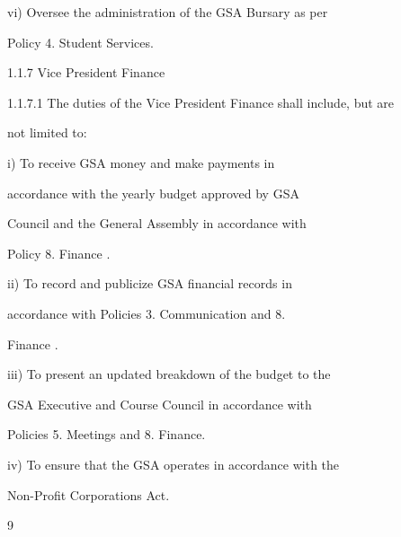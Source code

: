          vi)      Oversee  the  administration  of  the  GSA  Bursary  as  per  

                  Policy 4. Student Services.   

                    

1.1.7  Vice President Finance   

  

1.1.7.1 The duties of the Vice President Finance shall include, but are  

          not limited to:   

  

         i)       To      receive      GSA        money        and     make       payments         in  



                  accordance  with  the  yearly  budget  approved  by  GSA  



                  Council  and  the  General  Assembly  in  accordance  with  



                  Policy 8. Finance .   

  

         ii)      To   record   and   publicize   GSA   financial   records   in  



                  accordance   with   Policies   3.   Communication   and   8.  



                  Finance .   

  

         iii)     To  present  an  updated  breakdown  of  the  budget  to  the  



                  GSA Executive and Course Council in accordance with  



                  Policies 5. Meetings and 8. Finance.   

  

         iv)      To ensure that the GSA operates in accordance with the  

                  Non-Profit Corporations Act.   

  



                                                  9  

                                      

